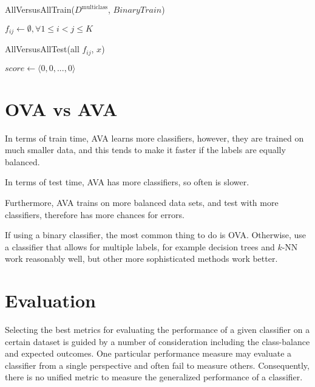 \begin{algorithm}
    \caption{AllVersusAllTrain($D^\text{multiclass}$, $BinaryTrain$)}
    \label{alg:avatrain}
	$f_{ij} \gets \emptyset, \forall 1 \leq i < j \leq K$\;
    \end{algorithm}

	\begin{algorithm}
		\caption{AllVersusAllTest(all $f_{ij}$, $x$)}
		\label{alg:avatest}
		$score \gets \langle 0, 0, ..., 0 \rangle$\;
		\end{algorithm}

\section{OVA vs AVA}
In terms of train time, AVA learns more classifiers, however, they are trained on much smaller data, and this tends to make it faster if the labels are equally balanced.

In terms of test time, AVA has more classifiers, so often is slower.

Furthermore, AVA trains on more balanced data sets, and test with more classifiers, therefore has more chances for errors.

If using a binary classifier, the most common thing to do is OVA. Otherwise, use a classifier that allows for multiple labels, for example decision trees and \(k\)-NN work reasonably well, but other more sophisticated methods work better.

\section{Evaluation}

Selecting the best metrics for evaluating the performance of a given classifier on a certain dataset is guided by a number of consideration including the class-balance and expected outcomes. One particular performance measure may evaluate a classifier from a single perspective and often fail to measure others. Consequently, there is no unified metric to measure the generalized performance of a classifier.

